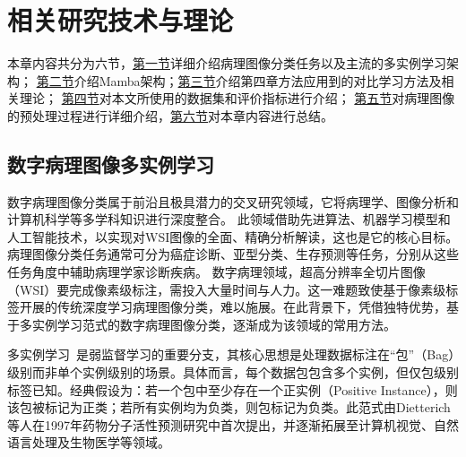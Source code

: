 \chapter[\hspace{0pt}相关研究技术与理论]{{\heiti{}\hspace{0pt}相关研究技术与理论}}

\removelofgap
\removelotgap

本章内容共分为六节，\hyperref[section2: 数字病理图像多实例学习]{第一节}详细介绍病理图像分类任务以及主流的多实例学习架构；
\hyperref[section2: Mamba架构]{第二节}介绍Mamba架构；\hyperref[section2: 对比学习]{第三节}介绍第四章方法应用到的对比学习方法及相关理论；
\hyperref[section2: 数据集及评价指标]{第四节}对本文所使用的数据集和评价指标进行介绍；
\hyperref[section2: 病理图像的预处理过程]{第五节}对病理图像的预处理过程进行详细介绍，\hyperref[section2: 本章小结]{第六节}对本章内容进行总结。

\section[\hspace{-2pt}数字病理图像多实例学习]{{\heiti{} \hspace{-8pt}数字病理图像多实例学习}}\label{section2: 数字病理图像多实例学习}

数字病理图像分类属于前沿且极具潜力的交叉研究领域，它将病理学、图像分析和计算机科学等多学科知识进行深度整合。
此领域借助先进算法、机器学习模型和人工智能技术，以实现对WSI图像的全面、精确分析解读，这也是它的核心目标。 
病理图像分类任务通常可分为癌症诊断、亚型分类、生存预测等任务，分别从这些任务角度中辅助病理学家诊断疾病。
数字病理领域，超高分辨率全切片图像（WSI）要完成像素级标注，需投入大量时间与人力。这一难题致使基于像素级标签开展的传统深度学习病理图像分类，难以施展。在此背景下，凭借独特优势，基于多实例学习范式的数字病理图像分类，逐渐成为该领域的常用方法。

多实例学习~\cite{dietterich1997solving}是弱监督学习的重要分支，其核心思想是处理数据标注在“包”（Bag）级别而非单个实例级别的场景。具体而言，每个数据包包含多个实例，但仅包级别标签已知。经典假设为：若一个包中至少存在一个正实例（Positive Instance），则该包被标记为正类；若所有实例均为负类，则包标记为负类。此范式由Dietterich等人在1997年药物分子活性预测研究中首次提出，并逐渐拓展至计算机视觉、自然语言处理及生物医学等领域。

